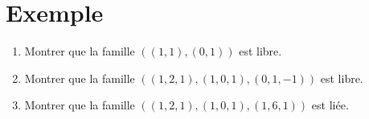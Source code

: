\documentclass[../main.tex]{subfiles}
\begin{document}
\section{Exemple}
\begin{tcolorbox}[title=Exemple 20.54, title filled=false, colframe=darkgreen, colback=darkgreen!10!white]
    \begin{enumerate}
        \item Montrer que la famille $((1, 1), (0, 1))$ est libre. 
        \item Montrer que la famille $((1, 2, 1), (1, 0, 1), (0, 1, -1))$ est libre. 
        \item Montrer que la famille $((1, 2, 1), (1, 0, 1), (1, 6, 1))$ est liée. 
    \end{enumerate}
\end{tcolorbox}
\end{document}
